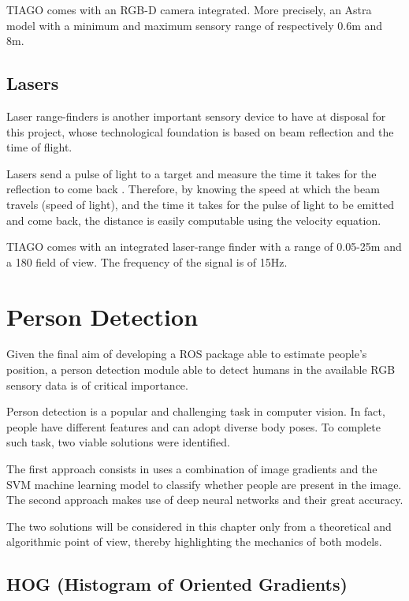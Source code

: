 TIAGO comes with an RGB-D camera integrated. More precisely, an Astra model with a minimum and maximum sensory range of respectively 0.6m and 8m.

\subsection{Lasers}

Laser range-finders is another important sensory device to have at disposal for this project, whose technological foundation is based on beam reflection and the time of flight.

Lasers send a pulse of light to a target and measure the time it takes for the reflection to come back \cite{website:lasers}. Therefore, by knowing the speed at which the beam travels (speed of light), and the time it takes for the pulse of light to be emitted and come back, the distance is easily computable using the velocity equation.

TIAGO comes with an integrated laser-range finder with a range of 0.05-25m and a 180\textdegree{} field of view. The frequency of the signal is of 15Hz.

\section{Person Detection}

Given the final aim of developing a ROS package able to estimate people's position, a person detection module able to detect humans in the available RGB sensory data is of critical importance.

Person detection is a popular and challenging task in computer vision. In fact, people have different features and can adopt diverse body poses. To complete such task, two viable solutions were identified.

The first approach consists in uses a combination of image gradients and the SVM machine learning model to classify whether people are present in the image. The second approach makes use of deep neural networks and their great accuracy.

The two solutions will be considered in this chapter only from a theoretical and algorithmic point of view, thereby highlighting the mechanics of both models.

\subsection{HOG (Histogram of Oriented Gradients)}

